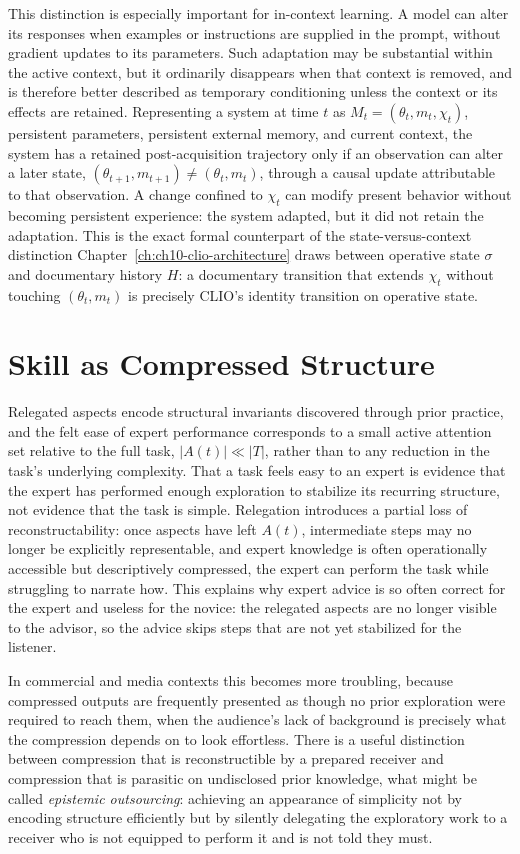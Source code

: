 This distinction is especially important for in-context learning. A model can alter its responses when examples or instructions are supplied in the prompt, without gradient updates to its parameters. Such adaptation may be substantial within the active context, but it ordinarily disappears when that context is removed, and is therefore better described as temporary conditioning unless the context or its effects are retained. Representing a system at time $t$ as $M_t = (\theta_t, m_t, \chi_t)$, persistent parameters, persistent external memory, and current context, the system has a retained post-acquisition trajectory only if an observation can alter a later state, $(\theta_{t+1}, m_{t+1}) \neq (\theta_t, m_t)$, through a causal update attributable to that observation. A change confined to $\chi_t$ can modify present behavior without becoming persistent experience: the system adapted, but it did not retain the adaptation. This is the exact formal counterpart of the state-versus-context distinction Chapter~\ref{ch:ch10-clio-architecture} draws between operative state $\sigma$ and documentary history $H$: a documentary transition that extends $\chi_t$ without touching $(\theta_t, m_t)$ is precisely CLIO's identity transition on operative state.

\section{Skill as Compressed Structure}

Relegated aspects encode structural invariants discovered through prior practice, and the felt ease of expert performance corresponds to a small active attention set relative to the full task, $|A(t)| \ll |T|$, rather than to any reduction in the task's underlying complexity. That a task feels easy to an expert is evidence that the expert has performed enough exploration to stabilize its recurring structure, not evidence that the task is simple. Relegation introduces a partial loss of reconstructability: once aspects have left $A(t)$, intermediate steps may no longer be explicitly representable, and expert knowledge is often operationally accessible but descriptively compressed, the expert can perform the task while struggling to narrate how. This explains why expert advice is so often correct for the expert and useless for the novice: the relegated aspects are no longer visible to the advisor, so the advice skips steps that are not yet stabilized for the listener.

In commercial and media contexts this becomes more troubling, because compressed outputs are frequently presented as though no prior exploration were required to reach them, when the audience's lack of background is precisely what the compression depends on to look effortless. There is a useful distinction between compression that is reconstructible by a prepared receiver and compression that is parasitic on undisclosed prior knowledge, what might be called \emph{epistemic outsourcing}: achieving an appearance of simplicity not by encoding structure efficiently but by silently delegating the exploratory work to a receiver who is not equipped to perform it and is not told they must.

